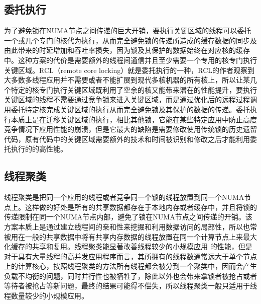 \subsection{委托执行}
为了避免锁在NUMA节点之间传递的巨大开销，要执行关键区域的线程可以委托一个或几个专门的核代为执行\cite{oyama1999executing}\cite{lozi2012remote}\cite{fatourou2012revisiting}\cite{hendler2010flat}\cite{guiroux2016multicore}，从而完全避免锁的传递所造成的缓存数据的同步及由此带来的时延增加和吞吐率损失，因为锁及其保护的数据始终在对应核的缓存中。这种方案的代价是需要额外的线程间通信并且至少需要一个专用的核专门执行关键区域。RCL（remote core locking）\cite{lozi2012remote}就是委托执行的一种，RCL的作者观察到大多数多线程应用并不需要或者不能扩展到现代多核机器的所有核上，所以让某几个特定的核专门执行关键区域既利用了空余的核又能带来潜在的性能提升，要执行关键区域的线程不需要通过竞争锁来进入关键区域，而是通过优化后的远程过程调用委托特定核完成关键区域的执行从而完全避免锁及其保护的数据的传递。委托执行本质上是在迁移关键区域的执行，相比其他锁，它能在某些特定应用中防止高度竞争情况下应用性能的崩溃，但是它最大的缺陷是需要修改使用传统锁的历史遗留代码，原有代码中的关键区域需要额外的技术和时间被识别和修改之后才能利用委托执行的的高性能。

\subsection{线程聚类}
线程聚类是把同一个应用的线程或者竞争同一个锁的线程放置到同一个NUMA节点上\cite{tam2007thread}\cite{thekkath1994impact}\cite{xian2008contention}。这样做的好处是所有的共享数据都存在于本地内存或者缓存中，并且将锁的传递限制在同一个NUMA节点内部，避免了锁在NUMA节点之间传递的开销。该方案本质上是通过建立线程间的亲和性来挖掘和利用数据访问的局部性，所以也常被用在一般的共享数据中将有共享内存数据的线程放置在同一个计算节点上来最大化缓存的共享和复用。线程聚类能显著改善线程较少的小规模应用
的性能，但是对于具有大量线程的高并发应用程序而言，其所拥有的线程数通常远大于单个节点上的计算核心，按照线程聚类的方法所有线程都会被分到一个聚类中，因而会产生负载不均衡的问题，同时并行性也被牺牲了，除此以外也会带来拿锁者被抢占或者等待者被抢占等新问题，最终的结果可能得不偿失，所以线程聚类一般只适用于线程数量较少的小规模应用。

